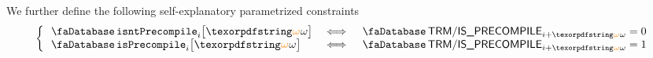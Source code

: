 We further define the following self-explanatory parametrized constraints
\[
	\left\{ \begin{array}{lcl}
		\accIsntPrecompile   {i}{\relof}  & \iff & \accTrmIsPrecompile   _{i + \relof} = 0 \\
		\accIsPrecompile     {i}{\relof}  & \iff & \accTrmIsPrecompile   _{i + \relof} = 1 \\
	\end{array} \right.
\]
